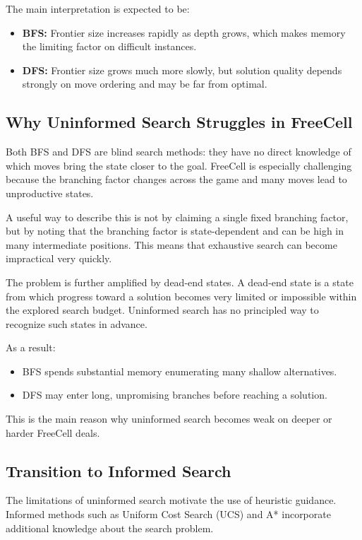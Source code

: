 \documentclass{article}
\begin{document}
The main interpretation is expected to be:
\begin{itemize}
\item \textbf{BFS:} Frontier size increases rapidly as depth grows, which makes memory the limiting factor on difficult instances.
\item \textbf{DFS:} Frontier size grows much more slowly, but solution quality depends strongly on move ordering and may be far from optimal.
\end{itemize}

\subsection{Why Uninformed Search Struggles in FreeCell}

Both BFS and DFS are blind search methods: they have no direct knowledge of which moves bring the state closer to the goal. FreeCell is especially challenging because the branching factor changes across the game and many moves lead to unproductive states.

A useful way to describe this is not by claiming a single fixed branching factor, but by noting that the branching factor is state-dependent and can be high in many intermediate positions. This means that exhaustive search can become impractical very quickly.

The problem is further amplified by dead-end states. A dead-end state is a state from which progress toward a solution becomes very limited or impossible within the explored search budget. Uninformed search has no principled way to recognize such states in advance.

As a result:
\begin{itemize}
\item BFS spends substantial memory enumerating many shallow alternatives.
\item DFS may enter long, unpromising branches before reaching a solution.
\end{itemize}

This is the main reason why uninformed search becomes weak on deeper or harder FreeCell deals.

\subsection{Transition to Informed Search}

The limitations of uninformed search motivate the use of heuristic guidance. Informed methods such as Uniform Cost Search (UCS) and A* incorporate additional knowledge about the search problem.
\end{document}
